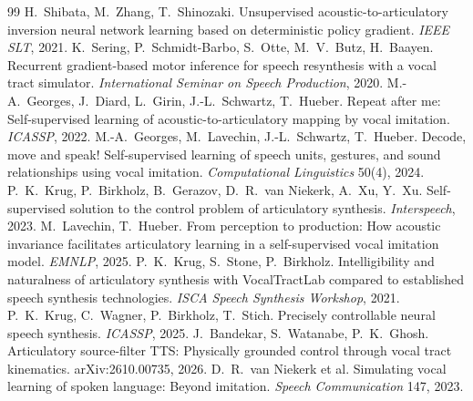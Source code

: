 \documentclass[10pt,a4paper,twocolumn]{article}
\begin{document}
\begin{thebibliography}{99}
 H.~Shibata, M.~Zhang, T.~Shinozaki. Unsupervised acoustic-to-articulatory
inversion neural network learning based on deterministic policy gradient. \emph{IEEE SLT},
2021.
 K.~Sering, P.~Schmidt-Barbo, S.~Otte, M.~V.~Butz, H.~Baayen. Recurrent
gradient-based motor inference for speech resynthesis with a vocal tract simulator.
\emph{International Seminar on Speech Production}, 2020.
 M.-A.~Georges, J.~Diard, L.~Girin, J.-L.~Schwartz, T.~Hueber. Repeat after
me: Self-supervised learning of acoustic-to-articulatory mapping by vocal imitation.
\emph{ICASSP}, 2022.
 M.-A.~Georges, M.~Lavechin, J.-L.~Schwartz, T.~Hueber. Decode, move and
speak! Self-supervised learning of speech units, gestures, and sound relationships using vocal
imitation. \emph{Computational Linguistics} 50(4), 2024.
 P.~K.~Krug, P.~Birkholz, B.~Gerazov, D.~R.~van Niekerk, A.~Xu, Y.~Xu.
Self-supervised solution to the control problem of articulatory synthesis. \emph{Interspeech},
2023.
 M.~Lavechin, T.~Hueber. From perception to production: How acoustic
invariance facilitates articulatory learning in a self-supervised vocal imitation model.
\emph{EMNLP}, 2025.
 P.~K.~Krug, S.~Stone, P.~Birkholz. Intelligibility and naturalness of
articulatory synthesis with VocalTractLab compared to established speech synthesis
technologies. \emph{ISCA Speech Synthesis Workshop}, 2021.
 P.~K.~Krug, C.~Wagner, P.~Birkholz, T.~Stich. Precisely controllable neural
speech synthesis. \emph{ICASSP}, 2025.
 J.~Bandekar, S.~Watanabe, P.~K.~Ghosh. Articulatory source-filter TTS:
Physically grounded control through vocal tract kinematics. arXiv:2610.00735, 2026.
 D.~R.~van Niekerk et al. Simulating vocal learning of spoken language: Beyond
imitation. \emph{Speech Communication} 147, 2023.
\end{thebibliography}
\end{document}
